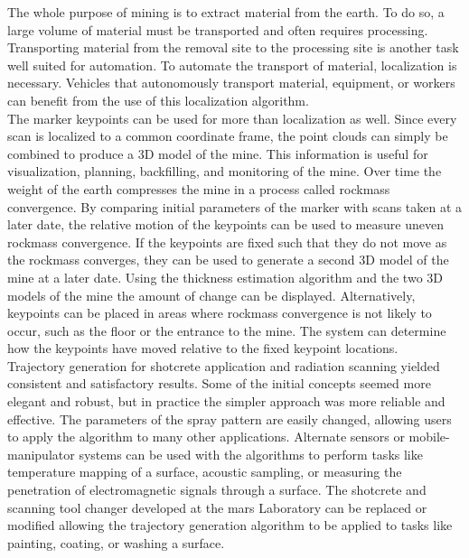 The whole purpose of mining is to extract material from the earth. To do so, a large volume of material must be transported and often requires processing. Transporting material from the removal site to the processing site is another task well suited for automation. To automate the transport of material, localization is necessary. Vehicles that autonomously transport material, equipment, or workers can benefit from the use of this localization algorithm.\\

The marker keypoints can be used for more than localization as well. Since every scan is localized to a common coordinate frame, the point clouds can simply be combined to produce a 3D model of the mine. This information is useful for visualization, planning, backfilling, and monitoring of the mine. Over time the weight of the earth compresses the mine in a process called rockmass convergence. By comparing initial parameters of the marker with scans taken at a later date, the relative motion of the keypoints can be used to measure uneven rockmass convergence. If the keypoints are fixed such that they do not move as the rockmass converges, they can be used to generate a second 3D model of the mine at a later date. Using the thickness estimation algorithm and the two 3D models of the mine the amount of change can be displayed. Alternatively, keypoints can be placed in areas where rockmass convergence is not likely to occur, such as the floor or the entrance to the mine. The system can determine how the keypoints have moved relative to the fixed keypoint locations.\\

Trajectory generation for shotcrete application and radiation scanning yielded consistent and satisfactory results. Some of the initial concepts seemed more elegant and robust, but in practice the simpler approach was more reliable and effective. The parameters of the spray pattern are easily changed, allowing users to apply the algorithm to many other applications. Alternate sensors or mobile-manipulator systems can be used with the algorithms to perform tasks like temperature mapping of a surface, acoustic sampling, or measuring the penetration of electromagnetic signals through a surface. The shotcrete and scanning tool changer developed at the \acrshort{mars} Laboratory can be replaced or modified allowing the trajectory generation algorithm to be applied to tasks like painting, coating, or washing a surface.\\

